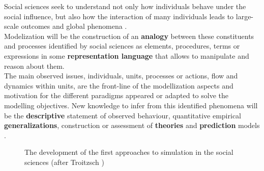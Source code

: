 \documentclass[11pt,oneside,a4paper,openright]{report}
\begin{document}
Social sciences seek to understand not only how individuals behave under the social influence, but also how the interaction of many individuals leads to large-scale outcomes and global phenomena \cite[p.9]{GordonBurt2010}.\\ 
Modelization will be the construction of an \textbf{analogy} between these constituents and processes identified by social sciences as elements, procedures, terms or expressions in some \textbf{representation language} that allows to manipulate and reason about them.\\  
The main observed issues, individuals, units, processes or actions, flow and dynamics within units, are the front-line of the 
modellization aspects and motivation for the different paradigms appeared or adapted to solve the modelling objectives. New 
knowledge to infer from this identified phenomena will be the \textbf{descriptive} statement of observed behaviour, quantitative 
empirical \textbf{generalizations}, construction or assessment of \textbf{theories} and \textbf{prediction} models \cite[p.9-53]{Coleman1964}.


\begin{figure}[!htb]
\centering
\setlength\fboxsep{0pt}
\setlength\fboxrule{0.5pt}
\caption{The development of the first approaches to simulation in the social sciences (after Troitzsch \cite{GilbertTroitzsch})}
\label{fig:SimAppGilbTro}
\end{figure}

\end{document}
